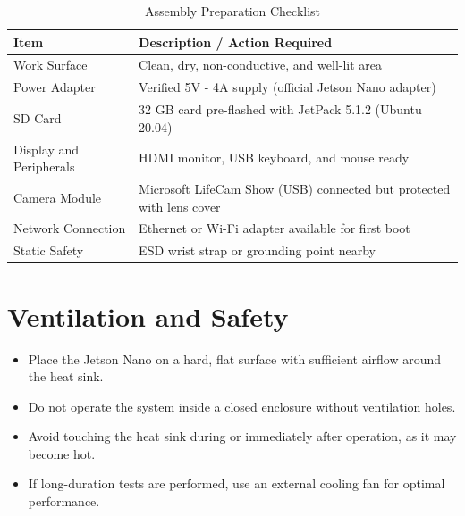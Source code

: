 \begin{table}[H]
	\centering
	\caption{Assembly Preparation Checklist}
	\begin{tabular}{|L{4cm}|L{9cm}|}
		\hline
		\textbf{Item} & \textbf{Description / Action Required} \\ \hline
		Work Surface & Clean, dry, non-conductive, and well-lit area \\ \hline
		Power Adapter & Verified 5V - 4A supply (official Jetson Nano adapter) \\ \hline
		SD Card & 32 GB card pre-flashed with JetPack 5.1.2 (Ubuntu 20.04) \\ \hline
		Display and Peripherals & HDMI monitor, USB keyboard, and mouse ready \\ \hline
		Camera Module & Microsoft LifeCam Show (USB) connected but protected with lens cover \\ \hline
		Network Connection & Ethernet or Wi-Fi adapter available for first boot \\ \hline
		Static Safety & ESD wrist strap or grounding point nearby \\ \hline
	\end{tabular}
\end{table}

\section*{Ventilation and Safety}

\begin{itemize}
	\item Place the Jetson Nano on a hard, flat surface with sufficient airflow around the heat sink.  
	\item Do not operate the system inside a closed enclosure without ventilation holes.  
	\item Avoid touching the heat sink during or immediately after operation, as it may become hot.  
	\item If long-duration tests are performed, use an external cooling fan for optimal performance.
\end{itemize}


